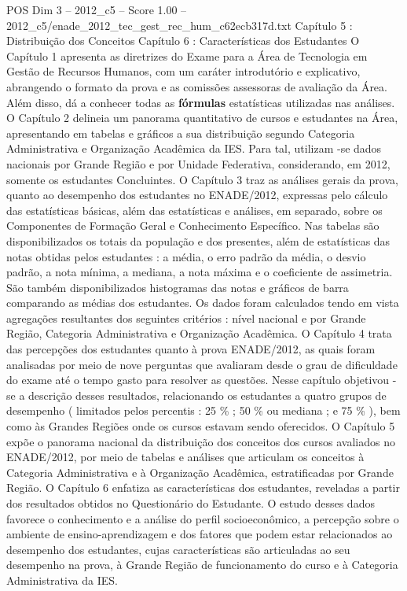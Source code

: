 \begin{textsample}{POS Dim 3 – 2012\_c5 – Score 1.00 – 2012\_c5/enade\_2012\_tec\_gest\_rec\_hum\_c62ecb317d.txt}  \label{ex:f3_pos_221}
Capítulo 5 : Distribuição dos Conceitos Capítulo 6 : Características dos Estudantes O Capítulo 1 apresenta as diretrizes do Exame para a Área de Tecnologia em Gestão de Recursos Humanos, com um caráter introdutório e explicativo, abrangendo o formato da prova e as comissões assessoras de avaliação da Área.
Além disso, dá a conhecer todas as \textbf{fórmulas} estatísticas utilizadas nas análises.
O Capítulo 2 delineia um panorama quantitativo de cursos e estudantes na Área, apresentando em tabelas e gráficos a sua distribuição segundo Categoria Administrativa e Organização Acadêmica da IES.
Para tal, utilizam -se dados nacionais por Grande Região e por Unidade Federativa, considerando, em 2012, somente os estudantes Concluintes.
O Capítulo 3 traz as análises gerais da prova, quanto ao desempenho dos estudantes no ENADE/2012, expressas pelo cálculo das estatísticas básicas, além das estatísticas e análises, em separado, sobre os Componentes de Formação Geral e Conhecimento Específico.
Nas tabelas são disponibilizados os totais da população e dos presentes, além de estatísticas das notas obtidas pelos estudantes : a média, o erro padrão da média, o desvio padrão, a nota mínima, a mediana, a nota máxima e o coeficiente de assimetria.
São também disponibilizados histogramas das notas e gráficos de barra comparando as médias dos estudantes.
Os dados foram calculados tendo em vista agregações resultantes dos seguintes critérios : nível nacional e por Grande Região, Categoria Administrativa e Organização Acadêmica.
O Capítulo 4 trata das percepções dos estudantes quanto à prova ENADE/2012, as quais foram analisadas por meio de nove perguntas que avaliaram desde o grau de dificuldade do exame até o tempo gasto para resolver as questões.
Nesse capítulo objetivou -se a descrição desses resultados, relacionando os estudantes a quatro grupos de desempenho ( limitados pelos percentis : 25 \% ; 50 \% ou mediana ; e 75 \% ), bem como às Grandes Regiões onde os cursos estavam sendo oferecidos.
O Capítulo 5 expõe o panorama nacional da distribuição dos conceitos dos cursos avaliados no ENADE/2012, por meio de tabelas e análises que articulam os conceitos à Categoria Administrativa e à Organização Acadêmica, estratificadas por Grande Região.
O Capítulo 6 enfatiza as características dos estudantes, reveladas a partir dos resultados obtidos no Questionário do Estudante.
O estudo desses dados favorece o conhecimento e a análise do perfil socioeconômico, a percepção sobre o ambiente de ensino-aprendizagem e dos fatores que podem estar relacionados ao desempenho dos estudantes, cujas características são articuladas ao seu desempenho na prova, à Grande Região de funcionamento do curso e à Categoria Administrativa da IES.

\end{textsample}
